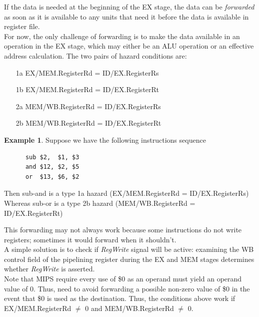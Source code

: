 \documentclass[12pt]{article}
\theoremstyle{definition}
\newtheorem{ex}{Example}[section]
\begin{document}
  If the data is needed at the beginning of the EX stage, the data can be \emph{forwarded} as soon as it is available to any units that need it before the data is available in register file. \\
  For now, the only challenge of forwarding is to make the data available in an operation in the EX stage, which may either be an ALU operation or an effective address calculation.
  The two pairs of hazard conditions are:
  \begin{enumerate}
    \item[1a] EX/MEM.RegisterRd = ID/EX.RegisterRs
    \item[1b] EX/MEM.RegisterRd = ID/EX.RegisterRt
    \item[2a] MEM/WB.RegisterRd = ID/EX.RegisterRs
    \item[2b] MEM/WB.RegisterRd = ID/EX.RegisterRt
  \end{enumerate}

  \begin{ex}
    Suppose we have the following instructions sequence
    \begin{verbatim}
      sub $2,  $1, $3
      and $12, $2, $5
      or  $13, $6, $2
    \end{verbatim}
    Then sub-and is a type 1a hazard (EX/MEM.RegisterRd = ID/EX.RegisterRs)
    Whereas sub-or is a type 2b hazard (MEM/WB.RegisterRd = ID/EX.RegisterRt)
  \end{ex}
  This forwarding may not always work because some instructions do not write registers;
  sometimes it would forward when it shouldn't. \\
  A simple solution is to check if \emph{RegWrite} signal will be active: examining the WB control field of the pipelining register during the EX and MEM stages determines whether \emph{RegWrite} is asserted. \\
  Note that MIPS require every use of \$0 as an operand must yield an operand value of 0.
  Thus, need to avoid forwarding a possible non-zero value of \$0 in the event that \$0 is used as the destination.
  Thus, the conditions above work if EX/MEM.RegisterRd $\not =$ 0 and MEM/WB.RegisterRd $\not =$ 0.
\end{document}
